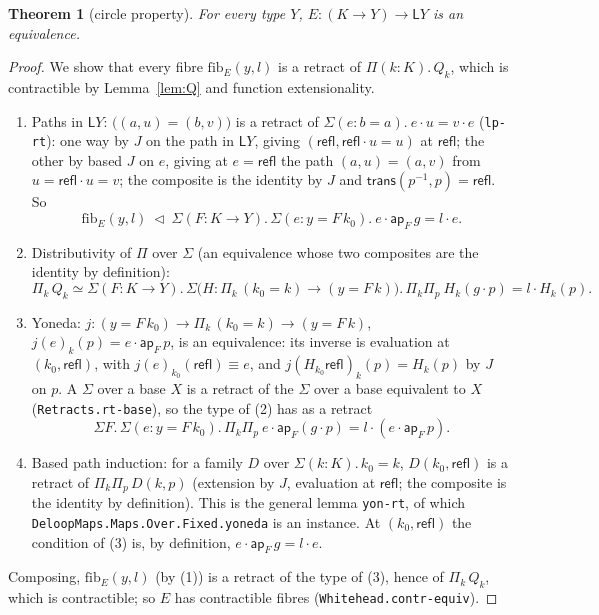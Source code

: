 \documentclass[11pt]{amsart}
\newtheorem{theorem}{Theorem}
\theoremstyle{definition}
\theoremstyle{remark}
\newcommand{\fib}{\mathrm{fib}}
\newcommand{\code}[1]{\texttt{#1}}
\newcommand{\Lp}{\mathsf{L}}
\newcommand{\cc}{\cdot}
\begin{document}
\begin{theorem}[circle property]\label{thm:circle}
For every type $Y$, $E:(K\to Y)\to\Lp Y$ is an equivalence.
\end{theorem}
\begin{proof}
We show that every fibre $\fib_E(y,l)$ is a retract of
$\Pi(k:K).\,Q_k$, which is contractible by Lemma~\ref{lem:Q} and
function extensionality.
\begin{enumerate}
\item Paths in $\Lp Y$: $\big((a,u)=(b,v)\big)$ is a retract of
  $\Sigma(e:b=a).\ e\cc u=v\cc e$ (\code{lp-rt}): one way by $J$ on the
  path in $\Lp Y$, giving $(\mathsf{refl},\mathsf{refl}\cc u=u)$ at
  $\mathsf{refl}$; the other by based $J$ on $e$, giving at $e=\mathsf{refl}$ the
  path $(a,u)=(a,v)$ from $u=\mathsf{refl}\cc u=v$; the composite is the
  identity by $J$ and $\mathsf{trans}(p^{-1},p)=\mathsf{refl}$. So
  \[\fib_E(y,l)\ \triangleleft\ \Sigma(F:K\to Y).\,\Sigma(e:y=F\,k_0).\ e\cc\mathsf{ap}_F\,g=l\cc e.\]
\item Distributivity of $\Pi$ over $\Sigma$ (an equivalence whose two
  composites are the identity by definition):
  \[\Pi_k\,Q_k\simeq\Sigma(F:K\to Y).\,\Sigma\big(H:\Pi_k\,(k_0=k)\to(y=F\,k)\big).\,
    \Pi_k\Pi_p\ H_k(g\cc p)=l\cc H_k(p).\]
\item Yoneda: $j:(y=F\,k_0)\to\Pi_k\,(k_0=k)\to(y=F\,k)$,
  $j(e)_k(p)=e\cc\mathsf{ap}_F\,p$, is an equivalence: its inverse is
  evaluation at $(k_0,\mathsf{refl})$, with $j(e)_{k_0}(\mathsf{refl})\equiv e$,
  and $j(H_{k_0}\mathsf{refl})_k(p)=H_k(p)$ by $J$ on $p$. A $\Sigma$ over a
  base $X$ is a retract of the $\Sigma$ over a base equivalent to $X$
  (\code{Retracts.rt-base}), so the type of (2) has as a retract
  \[\Sigma F.\,\Sigma(e:y=F\,k_0).\,\Pi_k\Pi_p\
    e\cc\mathsf{ap}_F(g\cc p)=l\cc(e\cc\mathsf{ap}_F\,p).\]
\item Based path induction: for a family $D$ over $\Sigma(k:K).\,k_0=k$,
  $D(k_0,\mathsf{refl})$ is a retract of $\Pi_k\Pi_p\,D(k,p)$ (extension by
  $J$, evaluation at $\mathsf{refl}$; the composite is the identity by
  definition). This is the general lemma \code{yon-rt}, of which
  \code{DeloopMaps.Maps.Over.Fixed.yoneda} is an instance.
  At $(k_0,\mathsf{refl})$ the condition of (3) is, by definition,
  $e\cc\mathsf{ap}_F\,g=l\cc e$.
\end{enumerate}
Composing, $\fib_E(y,l)$ (by (1)) is a retract of the type of (3), hence
of $\Pi_k\,Q_k$, which is contractible; so $E$ has contractible fibres
(\code{Whitehead.contr-equiv}).
\end{proof}
\end{document}
